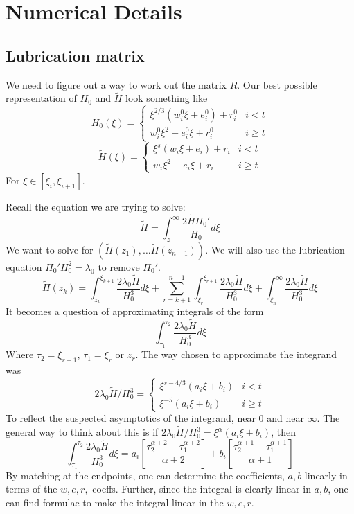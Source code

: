 \documentclass{article}
\begin{document}
\section{Numerical Details}
\subsection{Lubrication matrix}
We need to figure out a way to work out the matrix $R$. Our best possible 
representation of $H_0$ and $\tilde{H}$ look something like
\[ H_0(\xi) = \left\{ \begin{array}{cc} \xi^{2/3}(w_i^0\xi+e_i^0)+r_i^0 &
i <t \\ w_i^0\xi^2+e_i^0\xi + r_i^0 & i \geq t \end{array} \right. \]
%
\[ \tilde{H}(\xi) = \left\{ \begin{array}{cc} \xi^{s}(w_i\xi+e_i)+r_i &
i <t \\ w_i\xi^2+e_i\xi + r_i & i \geq t \end{array} \right. \]
For $\xi \in [\xi_i,\xi_{i+1}]$. 

Recall the equation we are trying to solve:
\[ \tilde{\Pi} = \int_z^{\infty} \frac{2 \tilde{H} \Pi_0'}{H_0} d\xi \]
We want to solve for $(\tilde{\Pi}(z_1), \dots \tilde{\Pi}(z_{n-1}))$.
We will also use the lubrication equation $\Pi_0'H_0^2=\lambda_0$ 
to remove $\Pi_0'$.
\[ \tilde{\Pi}(z_k) = \int_{z_k}^{\xi_{k+1}} \frac{2\lambda_0 \tilde{H}}{H_0^3} 
d\xi + \sum_{r=k+1}^{n-1}\int_{\xi_r}^{\xi_{r+1}} \frac{2\lambda_0 \tilde{H}}
{H_0^3} d\xi + \int_{\xi_n}^{\infty} \frac{2\lambda_0 \tilde{H}}
{H_0^3} d\xi\]
It becomes a question of approximating integrals of the form
\[ \int_{\tau_1}^{\tau_2} \frac{2\lambda_0 \tilde{H}}{H_0^3} d\xi \]
Where $\tau_2 = \xi_{r+1}$, $\tau_1 = \xi_r$ or $z_r$. The way chosen to 
approximate the integrand was
\[ 2\lambda_0\tilde{H}/H_0^3 = 
\left\{ \begin{array}{cc} \xi^{s-4/3}(a_i\xi+b_i) &
i <t \\ \xi^{-5}(a_i\xi+b_i) & i \geq t \end{array} \right. \]
To reflect the suspected asymptotics of the integrand, near 0 and near 
$\infty$. The general way to think about this is if 
$ 2\lambda_0\tilde{H}/H_0^3 = \xi^{\alpha}(a_i\xi+b_i) $, then
\[ \int_{\tau_1}^{\tau_2} \frac{2\lambda_0 \tilde{H}}{H_0^3} d\xi =
a_i\left[ \frac{\tau_2^{\alpha+2}-\tau_1^{\alpha+2}}{\alpha+2}\right]+
b_i\left[ \frac{\tau_2^{\alpha+1}-\tau_1^{\alpha+1}}{\alpha+1}\right] \]
By matching at the endpoints, one can determine the coefficients, $a,b$
linearly in terms of the $w,e,r,$ coeffs. Further, since the integral is
clearly linear in $a,b$,  one can find formulae to make the integral linear
in the $w,e,r$. 
\end{document}
